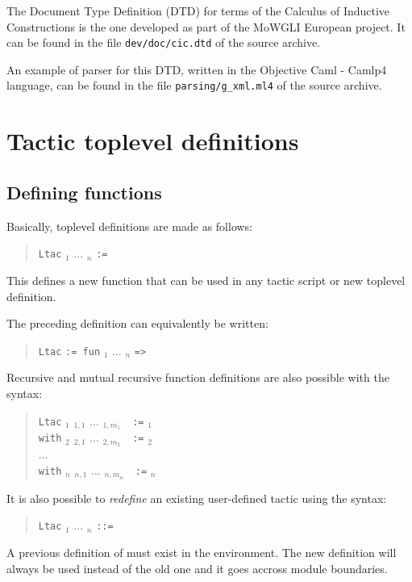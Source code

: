The Document Type Definition (DTD) for terms of the Calculus of
Inductive Constructions is the one developed as part of the MoWGLI
European project. It can be found in the file {\tt dev/doc/cic.dtd} of
the {\Coq} source archive.

An example of parser for this DTD, written in the Objective Caml -
Camlp4 language, can be found in the file {\tt parsing/g\_xml.ml4} of
the {\Coq} source archive.

\section[Tactic toplevel definitions]{Tactic toplevel definitions}

\subsection{Defining {\ltac} functions}

Basically, {\ltac} toplevel definitions are made as follows:
%
%
\begin{quote}
{\tt Ltac} {\ident} {\ident}$_1$ ... {\ident}$_n$ {\tt :=}
{\tacexpr}
\end{quote}
This defines a new {\ltac} function that can be used in any tactic
script or new {\ltac} toplevel definition.

\Rem The preceding definition can equivalently be written:
\begin{quote}
{\tt Ltac} {\ident} {\tt := fun} {\ident}$_1$ ... {\ident}$_n$
{\tt =>} {\tacexpr}
\end{quote}
Recursive and mutual recursive function definitions are also
possible with the syntax:
\begin{quote}
{\tt Ltac} {\ident}$_1$ {\ident}$_{1,1}$ ...
{\ident}$_{1,m_1}$~~{\tt :=} {\tacexpr}$_1$\\
{\tt with} {\ident}$_2$ {\ident}$_{2,1}$ ... {\ident}$_{2,m_2}$~~{\tt :=}
{\tacexpr}$_2$\\
...\\
{\tt with} {\ident}$_n$ {\ident}$_{n,1}$ ... {\ident}$_{n,m_n}$~~{\tt :=}
{\tacexpr}$_n$
\end{quote}
\medskip
It is also possible to \emph{redefine} an existing user-defined tactic
using the syntax:
\begin{quote}
{\tt Ltac} {\qualid} {\ident}$_1$ ... {\ident}$_n$ {\tt ::=}
{\tacexpr}
\end{quote}
A previous definition of \qualid must exist in the environment.
The new definition will always be used instead of the old one and
it goes accross module boundaries.

